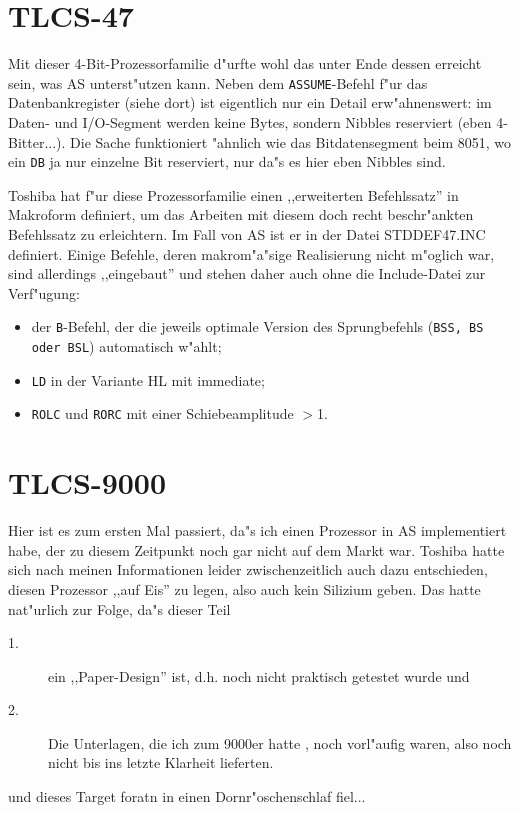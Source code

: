 \documentclass[12pt,a4paper,twoside]{report}
\newcommand{\tty}[1]{{\tt #1}}
\begin{document}

\section{TLCS-47}

Mit dieser 4-Bit-Prozessorfamilie d"urfte wohl das unter Ende dessen
erreicht sein, was AS unterst"utzen kann.  Neben dem \tty{ASSUME}-Befehl
f"ur das Datenbankregister (siehe dort) ist eigentlich nur ein Detail
erw"ahnenswert: im Daten- und I/O-Segment werden keine Bytes, sondern
Nibbles reserviert (eben 4-Bitter...).  Die Sache funktioniert "ahnlich
wie das Bitdatensegment beim 8051, wo ein \tty{DB} ja nur einzelne Bit
reserviert, nur da"s es hier eben Nibbles sind.
\par
Toshiba hat f"ur diese Prozessorfamilie einen ,,erweiterten Befehlssatz''
in Makroform definiert, um das Arbeiten mit diesem doch recht
beschr"ankten Befehlssatz zu erleichtern.  Im Fall von AS ist er in der
Datei STDDEF47.INC definiert.  Einige Befehle, deren makrom"a"sige
Realisierung nicht m"oglich war, sind allerdings ,,eingebaut'' und stehen
daher auch ohne die Include-Datei zur Verf"ugung:
\begin{itemize}
\item{der \tty{B}-Befehl, der die jeweils optimale Version des
      Sprungbefehls (\tty{BSS, BS oder BSL}) automatisch w"ahlt;}
\item{\tty{LD} in der Variante HL mit immediate;}
\item{\tty{ROLC} und \tty{RORC} mit einer Schiebeamplitude $>$1.}
\end{itemize}


\section{TLCS-9000}

Hier ist es zum ersten Mal passiert, da"s ich einen Prozessor in AS
implementiert habe, der zu diesem Zeitpunkt noch gar nicht auf dem
Markt war.  Toshiba hatte sich nach meinen Informationen leider
zwischenzeitlich auch dazu entschieden, diesen Prozessor ,,auf Eis''
zu legen, also auch kein Silizium geben.  Das hatte nat"urlich zur Folge,
da"s dieser Teil
\begin{description}
\item[1.]{ein ,,Paper-Design'' ist, d.h. noch nicht praktisch getestet
          wurde und}
\item[2.]{Die Unterlagen, die ich zum 9000er hatte \cite{Tosh9000},
          noch vorl"aufig waren, also noch nicht bis ins letzte Klarheit
          lieferten.}
\end{description}
und dieses Target foratn in einen Dornr"oschenschlaf fiel...
\end{document}
